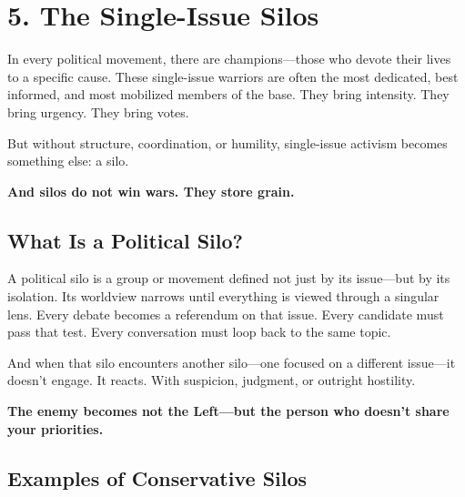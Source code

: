 \section*{5. The Single-Issue Silos}

In every political movement, there are champions—those who devote their lives to a specific cause. These single-issue warriors are often the most dedicated, best informed, and most mobilized members of the base. They bring intensity. They bring urgency. They bring votes.

But without structure, coordination, or humility, single-issue activism becomes something else: a silo.

\textbf{And silos do not win wars. They store grain.}

\subsection*{What Is a Political Silo?}

A political silo is a group or movement defined not just by its issue—but by its isolation. Its worldview narrows until everything is viewed through a singular lens. Every debate becomes a referendum on that issue. Every candidate must pass that test. Every conversation must loop back to the same topic.

And when that silo encounters another silo—one focused on a different issue—it doesn’t engage. It reacts. With suspicion, judgment, or outright hostility.

\textbf{The enemy becomes not the Left—but the person who doesn’t share your priorities.}

\subsection*{Examples of Conservative Silos}

